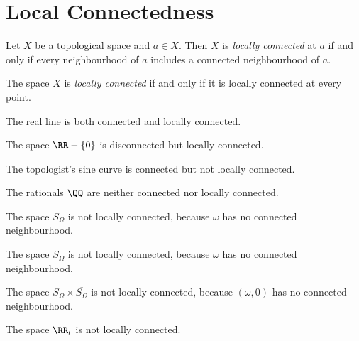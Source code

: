 \section{Local Connectedness}

\begin{definition}
    Let $X$ be a topological space and $a \in X$. Then $X$ is \emph{locally
    connected} at $a$ if and only if every neighbourhood of $a$ includes a
    connected neighbourhood of $a$.

    The space $X$ is \emph{locally connected} if and only if it is locally
    connected at every point.
\end{definition}

\begin{example}
    The real line is both connected and locally connected.
\end{example}

\begin{example}
    The space $\RR - \{0\}$ is disconnected but locally connected.
\end{example}

\begin{example}
    The topologist's sine curve is connected but not locally connected.
\end{example}

\begin{example}
    The rationals $\QQ$ are neither connected nor locally connected.
\end{example}

\begin{example}
    The space $S_\Omega$ is not locally connected, because $\omega$ has no connected neighbourhood.
\end{example}

\begin{example}
    The space $\overline{S_\Omega}$ is not locally connected, because $\omega$ has no connected neighbourhood.
\end{example}

\begin{example}
    The space $S_\Omega \times \overline{S_\Omega}$ is not locally connected, because $(\omega,0)$ has no connected neighbourhood.
\end{example}

\begin{example}
    The space $\RR_l$ is not locally connected.
\end{example}


